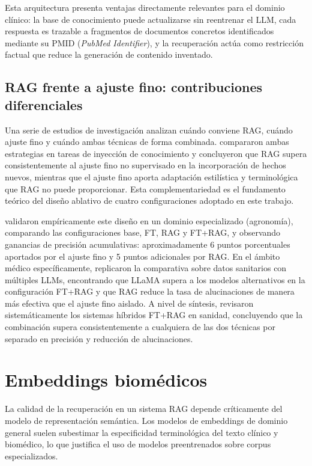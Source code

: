 \documentclass[11pt,a4paper,spanish]{book}
\numberwithin{equation}{chapter}
\numberwithin{figure}{chapter}
\begin{document}
Esta arquitectura presenta ventajas directamente relevantes para el dominio clínico: la base de conocimiento puede actualizarse sin reentrenar el LLM, cada respuesta es trazable a fragmentos de documentos concretos identificados mediante su PMID (\textit{PubMed Identifier}), y la recuperación actúa como restricción factual que reduce la generación de contenido inventado.

\subsection{RAG frente a ajuste fino: contribuciones diferenciales}

Una serie de estudios de investigación analizan cuándo conviene RAG, cuándo ajuste fino y cuándo ambas técnicas de forma combinada.  compararon ambas estrategias en tareas de inyección de conocimiento y concluyeron que RAG supera consistentemente al ajuste fino no supervisado en la incorporación de hechos nuevos, mientras que el ajuste fino aporta adaptación estilística y terminológica que RAG no puede proporcionar. Esta complementariedad es el fundamento teórico del diseño ablativo de cuatro configuraciones adoptado en este trabajo.

 validaron empíricamente este diseño en un dominio especializado (agronomía), comparando las configuraciones base, FT, RAG y FT+RAG, y observando ganancias de precisión acumulativas: aproximadamente 6 puntos porcentuales aportados por el ajuste fino y 5 puntos adicionales por RAG. En el ámbito médico específicamente,  replicaron la comparativa sobre datos sanitarios con múltiples LLMs, encontrando que LLaMA supera a los modelos alternativos en la configuración FT+RAG y que RAG reduce la tasa de alucinaciones de manera más efectiva que el ajuste fino aislado. A nivel de síntesis,  revisaron sistemáticamente los sistemas híbridos FT+RAG en sanidad, concluyendo que la combinación supera consistentemente a cualquiera de las dos técnicas por separado en precisión y reducción de alucinaciones.

\section{Embeddings biomédicos}

La calidad de la recuperación en un sistema RAG depende críticamente del modelo de representación semántica. Los modelos de embeddings de dominio general suelen subestimar la especificidad terminológica del texto clínico y biomédico, lo que justifica el uso de modelos preentrenados sobre corpus especializados.
\end{document}
